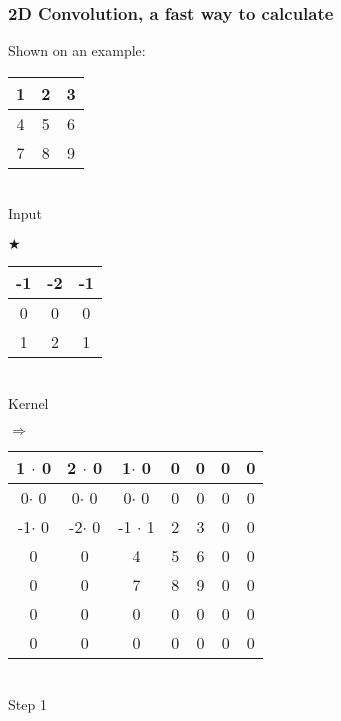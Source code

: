 \subsubsection{2D Convolution, a fast way to calculate}
Shown on an example: \\
	\begin{minipage}{2.1cm}
	\centering
		\begin{tabular}{|c|c|c|} \hline
			1 & 2 & 3 \\ \hline
	      	4 & 5 & 6 \\ \hline
	      	7 & 8 & 9 \\ \hline
	      \end{tabular} \\ 
	      Input
	\end{minipage}
	\begin{minipage}{0.3cm}
		$\bigstar$
	\end{minipage}
	\begin{minipage}{2.5cm}
	\centering
		\begin{tabular}{|c|c|c|} \hline
			\rowcolor{lightgray} -1 & -2 & -1 \\ \hline
	      	\cellcolor{lightgray} 0 & \cellcolor{gray} 0 & \cellcolor{lightgray} 0 \\ \hline
	      	\rowcolor{lightgray} 1 & 2 & 1 \\ \hline
	      \end{tabular}\\
	      Kernel
	\end{minipage}
	\begin{minipage}{0.3cm}
	\centering
			$\Rightarrow$
		\end{minipage}
	\begin{minipage}{7cm}
	\centering
		\begin{tabular}{|c|c|c|c|c|c|c|} \hline
			\cellcolor{lightgray} 1 $\cdot$ 0 & \cellcolor{lightgray} 2 $\cdot$ 0& \cellcolor{lightgray} 1$\cdot$ 0 & 0 & 0 & 0 & 0  \\ \hline
		 	\cellcolor{lightgray} 0$\cdot$ 0 & \cellcolor{gray} 0$\cdot$ 0  & \cellcolor{lightgray} 0$\cdot$ 0 & 0& 0 & 0 & 0 \\ \hline
	      	 \cellcolor{lightgray} -1$\cdot$ 0 & \cellcolor{lightgray} -2$\cdot$ 0  & \cellcolor{lightgray} -1 $\cdot$ 1 & 2 & 3 & 0 & 0\\ \hline
	      	 0 & 0 & 4 & 5 & 6 & 0 & 0 \\ \hline
	      	 0 & 0 & 7 & 8 & 9 & 0 & 0 \\ \hline
	      	 0 & 0 & 0 & 0 & 0 & 0& 0 \\ \hline
	      	 0 & 0 & 0 & 0 & 0 & 0& 0 \\ \hline
	      \end{tabular}\\
	      Step 1
	\end{minipage}
